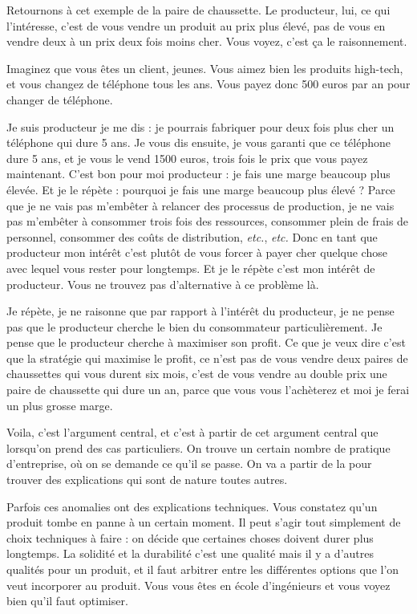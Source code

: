 \begin{small}
Retournons à cet exemple de la paire de chaussette. Le producteur, lui, ce qui l'intéresse, c'est de vous vendre un produit au prix plus élevé, pas de vous en vendre deux à un prix deux fois moins cher. Vous voyez, c'est ça le raisonnement. 

\smallbreak 
Imaginez que vous êtes un client, jeunes. Vous aimez bien les produits high-tech, et vous changez de téléphone tous les ans. Vous payez  donc 500 euros par an pour changer de téléphone. 

Je suis producteur je me dis : je pourrais fabriquer  pour deux fois plus cher un téléphone qui dure 5 ans. Je vous dis ensuite, je vous garanti que ce téléphone dure 5 ans, et je vous le vend 1500 euros, trois fois le prix que vous payez maintenant. C'est bon pour moi producteur : je fais une marge beaucoup plus élevée. Et je le répète : pourquoi je fais une marge beaucoup plus élevé ? Parce que je ne vais pas m'embêter à relancer des processus de production, je ne vais pas m'embêter à consommer trois fois des ressources, consommer plein de frais de  personnel, consommer des coûts de distribution, \textit{etc.}, \textit{etc.} Donc en tant que producteur mon intérêt c'est plutôt de vous \og forcer \fg{}  à payer cher quelque chose avec lequel vous rester pour longtemps. Et je le répète c'est mon intérêt de producteur. Vous ne trouvez pas d'alternative à ce problème là. 

Je répète, je ne raisonne que par rapport à l'intérêt du producteur, je ne pense pas que le producteur cherche le bien du consommateur particulièrement. Je pense que le producteur cherche à maximiser son profit. Ce que je veux dire c'est que la stratégie qui maximise le profit, ce n'est pas de vous vendre deux paires de chaussettes qui vous durent six mois, c'est de vous vendre au double prix une paire de chaussette qui dure un an, parce que vous vous l'achèterez et moi je ferai un plus grosse marge. 

Voila,  c'est l'argument central, et c'est à partir de cet argument central que lorsqu'on prend des cas particuliers. On trouve un certain nombre de pratique d'entreprise, où on se demande ce qu'il se passe. On va a partir de la pour trouver  des explications qui sont de nature toutes autres.  

Parfois ces anomalies ont des explications techniques. Vous constatez qu'un produit tombe en panne à un certain moment. Il peut s'agir tout simplement de  choix techniques à faire : on décide que certaines choses doivent durer plus longtemps. La solidité et la durabilité c'est une qualité mais il y a d'autres qualités pour un produit, et il faut arbitrer entre les différentes options que l'on veut incorporer au produit. Vous vous êtes en école d'ingénieurs et vous voyez bien qu'il faut optimiser. 


\end{small}
